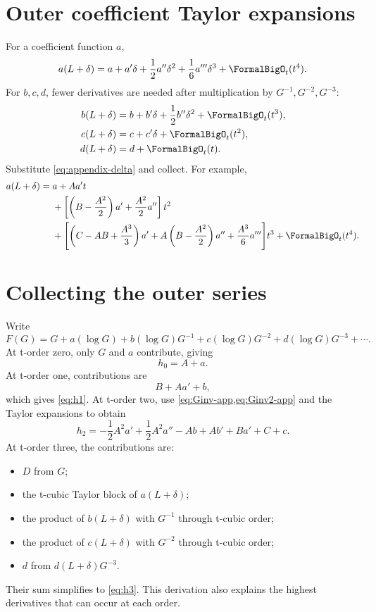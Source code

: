 \documentclass[11pt,openany]{book}
\theoremstyle{definition}
\theoremstyle{plain}
\theoremstyle{remark}
\begin{document}
\section{Outer coefficient Taylor expansions}
For a coefficient function \(a\),
\begin{equation}\label{eq:a-taylor-app}
 a(L+\delta)
 =a+a'\delta+\frac12a''\delta^2+\frac16a'''\delta^3
 +\FormalBigO_t(t^4).
\end{equation}
For \(b,c,d\), fewer derivatives are needed after multiplication by
\(G^{-1},G^{-2},G^{-3}\):
\begin{align*}
 b(L+\delta)&=b+b'\delta+\frac12b''\delta^2+\FormalBigO_t(t^3),\\
 c(L+\delta)&=c+c'\delta+\FormalBigO_t(t^2),\\
 d(L+\delta)&=d+\FormalBigO_t(t).
\end{align*}
Substitute \cref{eq:appendix-delta} and collect.  For example,
\begin{align*}
 a(L+\delta)
={}&a+Aa't\\
&+\left[
 \left(B-\frac{A^2}{2}\right)a'
 +\frac{A^2}{2}a''
 \right]t^2\\
&+\Biggl[
 \left(C-AB+\frac{A^3}{3}\right)a'
 +A\left(B-\frac{A^2}{2}\right)a''
 +\frac{A^3}{6}a'''
 \Biggr]t^3
 +\FormalBigO_t(t^4).
\end{align*}

\section{Collecting the outer series}
Write
\[
 F(G)=G+a(\log G)+b(\log G)G^{-1}
 +c(\log G)G^{-2}+d(\log G)G^{-3}+\cdots.
\]
At t-order zero, only \(G\) and \(a\) contribute, giving
\[
 h_0=A+a.
\]
At t-order one, contributions are
\[
 B+Aa'+b,
\]
which gives \cref{eq:h1}.  At t-order two, use
\cref{eq:Ginv-app,eq:Ginv2-app} and the Taylor expansions to obtain
\[
 h_2=-\frac12A^2a'+\frac12A^2a''-Ab+Ab'+Ba'+C+c.
\]
At t-order three, the contributions are:
\begin{itemize}
\item \(D\) from \(G\);
\item the t-cubic Taylor block of \(a(L+\delta)\);
\item the product of \(b(L+\delta)\) with \(G^{-1}\) through t-cubic order;
\item the product of \(c(L+\delta)\) with \(G^{-2}\) through t-cubic order;
\item \(d\) from \(d(L+\delta)G^{-3}\).
\end{itemize}
Their sum simplifies to \cref{eq:h3}.  This derivation also explains the
highest derivatives that can occur at each order.
\end{document}
